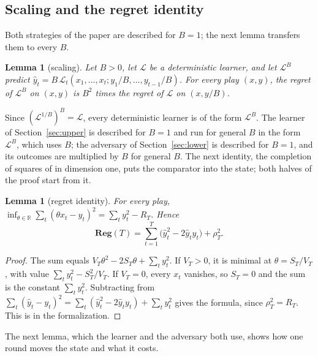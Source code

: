 \documentclass[12pt]{amsart}
\newtheorem{lemma}[theorem]{Lemma}
\theoremstyle{definition}
\numberwithin{equation}{section}
\newcommand{\R}{\mathbb{R}}
\newcommand{\Reg}{\mathbf{Reg}}
\newcommand{\yh}{\hat y}
\newcommand{\leanmap}[1]{\ignorespaces}
\newcommand{\mapnote}[1]{\ignorespaces}
\begin{document}
\subsection{Scaling and the regret identity}
Both strategies of the paper are described for $B=1$; the next lemma transfers them to every $B$.

\begin{lemma}[scaling]\label{lem:scaling}
\leanmap{RegretKappa.Corollaries.regret_rescale_inv, RegretKappa.Lower.regret_rescale,
  RegretKappa.Upper.bestLinearLoss_mul}
\mapnote{Lean proves the identity for every $B\ne0$.}
Let $B>0$, let $\mathcal L$ be a deterministic learner, and let $\mathcal L^B$ predict $\yh_t=B\,\mathcal L_t(x_1,\dots,x_t;y_1/B,\dots,y_{t-1}/B)$. For every play $(x,y)$, the regret of $\mathcal L^B$ on $(x,y)$ is $B^2$ times the regret of $\mathcal L$ on $(x,y/B)$.
\end{lemma}

Since $(\mathcal L^{1/B})^B=\mathcal L$, every deterministic learner is of the form $\mathcal L^B$. The learner of Section~\ref{sec:upper} is described for $B=1$ and run for general $B$ in the form $\mathcal L^B$, which uses $B$; the adversary of Section~\ref{sec:lower} is described for $B=1$, and its outcomes are multiplied by $B$ for general $B$. The next identity, the completion of squares of \citet[Section~2.1]{CQRZ} in dimension one, puts the comparator into the state; both halves of the proof start from it.

\begin{lemma}[regret identity]\label{lem:identity}
\leanmap{RegretKappa.Lower.regret_eq, RegretKappa.Upper.bestLinearLoss_closed,
  RegretKappa.Upper.sum_sq_sub_bestLinearLoss}
For every play, $\inf_{\theta\in\R}\sum_t(\theta x_t-y_t)^2=\sum_ty_t^2-R_T$. Hence
\[
\Reg(T)=\sum_{t=1}^T\bigl(\yh_t^2-2\yh_ty_t\bigr)+\rho_T^2 .
\]
\end{lemma}

\begin{proof}
The sum equals $V_T\theta^2-2S_T\theta+\sum_ty_t^2$. If $V_T>0$, it is minimal at $\theta=S_T/V_T$, with value $\sum_ty_t^2-S_T^2/V_T$. If $V_T=0$, every $x_t$ vanishes, so $S_T=0$ and the sum is the constant $\sum_ty_t^2$. Subtracting from $\sum_t(\yh_t-y_t)^2=\sum_t(\yh_t^2-2\yh_ty_t)+\sum_ty_t^2$ gives the formula, since $\rho_T^2=R_T$. This is  in the formalization.
\end{proof}

The next lemma, which the learner and the adversary both use, shows how one round moves the state and what it costs.
\end{document}
